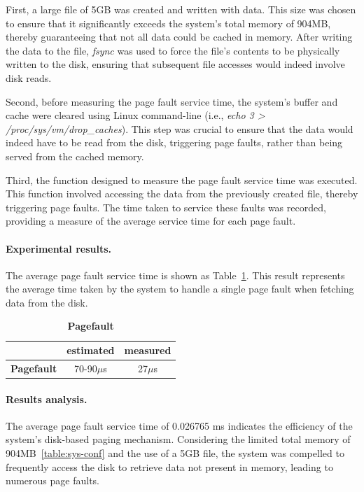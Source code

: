 First, a large file of 5GB was created and written with data. This size was chosen to ensure that it significantly exceeds the system's total memory of 904MB, thereby guaranteeing that not all data could be cached in memory. After writing the data to the file, \emph{fsync} was used to force the file's contents to be physically written to the disk, ensuring that subsequent file accesses would indeed involve disk reads.

Second, before measuring the page fault service time, the system's buffer and cache were cleared using Linux command-line (i.e., \emph{echo 3 > /proc/sys/vm/drop\_caches}). This step was crucial to ensure that the data would indeed have to be read from the disk, triggering page faults, rather than being served from the cached memory.

Third, the function designed to measure the page fault service time was executed. This function involved accessing the data from the previously created file, thereby triggering page faults. The time taken to service these faults was recorded, providing a measure of the average service time for each page fault.

\paragraph{Experimental results.}
The average page fault service time is shown as Table~\ref{table:ram-pagefault}.
This result represents the average time taken by the system to handle a single page fault when fetching data from the disk.

\begin{table}[h]
	\centering
	\begin{tabular}{c|c|c}
		\hline
		\makecell{Type} & estimated & measured\\ \hline
        \textbf{Pagefault} &  70-90$\mu$s & 27$\mu$s  \\ \hline
	\end{tabular}
	\caption{\textbf{Pagefault}}
	\label{table:ram-pagefault}
\end{table}

\paragraph{Results analysis.}
The average page fault service time of 0.026765 ms indicates the efficiency of the system's disk-based paging mechanism. Considering the limited total memory of 904MB~\ref{table:sys-conf} and the use of a 5GB file, the system was compelled to frequently access the disk to retrieve data not present in memory, leading to numerous page faults.

